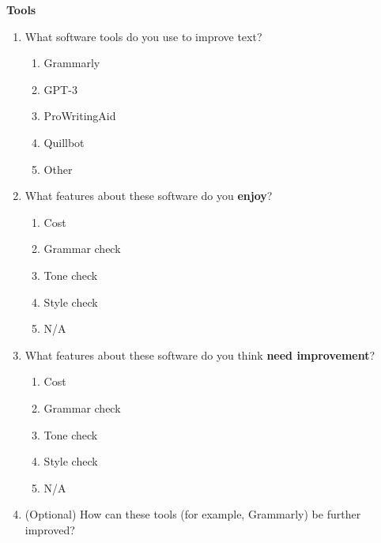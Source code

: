 \documentclass[acmsmall,screen,authorversion,nonacm]{acmart}
\begin{document}
\textbf{Tools}
\begin{enumerate}
    \item What software tools do you use to improve text? 
        \begin{enumerate}
            \item Grammarly
            \item GPT-3
            \item ProWritingAid
            \item Quillbot
            \item Other
        \end{enumerate}
    \item What features about these software do you \textbf{enjoy}?
        \begin{enumerate}
            \item Cost
            \item Grammar check
            \item Tone check
            \item Style check
            \item N/A
        \end{enumerate}
    \item What features about these software do you think \textbf{need improvement}?
        \begin{enumerate}
            \item Cost
            \item Grammar check
            \item Tone check
            \item Style check
            \item N/A
        \end{enumerate}
    \item (Optional) How can these tools (for example, Grammarly) be further improved?
\end{enumerate}
\end{document}
